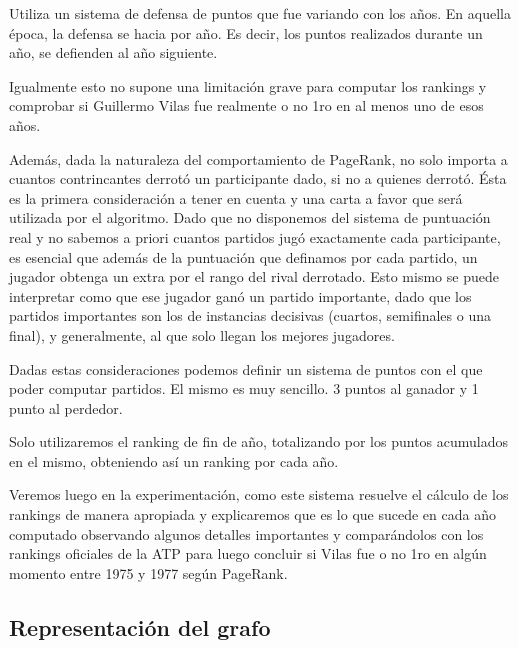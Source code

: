 Utiliza un sistema de defensa de puntos que fue variando con los años. En aquella época, la defensa se hacia por año. Es decir, los puntos realizados durante un año, se defienden al año siguiente. 

Igualmente esto no supone una limitación grave para computar los rankings y comprobar si Guillermo Vilas fue realmente o no 1ro en al menos uno de esos años.

Además, dada la naturaleza del comportamiento de PageRank, no solo importa a cuantos contrincantes derrotó un participante dado, si no a quienes derrotó. Ésta es la primera consideración a tener en cuenta y una carta a favor que será utilizada por el algoritmo. Dado que no disponemos del sistema de puntuación real y no sabemos a priori cuantos partidos jugó exactamente cada participante, es esencial que además de la puntuación que definamos por cada partido, un jugador obtenga un extra por el rango del rival derrotado. Esto mismo se puede interpretar como que ese jugador ganó un partido importante, dado que los partidos importantes son los de instancias decisivas (cuartos, semifinales o una final), y generalmente, al que solo llegan los mejores jugadores.    

Dadas estas consideraciones podemos definir un sistema de puntos con el que poder computar partidos. El mismo es muy sencillo. 3 puntos al ganador y 1 punto al perdedor.

Solo utilizaremos el ranking de fin de año, totalizando por los puntos acumulados en el mismo, obteniendo así un ranking por cada año.
 
Veremos luego en la experimentación, como este sistema resuelve el cálculo de los rankings de manera apropiada y explicaremos que es lo que sucede en cada año computado observando algunos detalles importantes y comparándolos con los rankings oficiales de la ATP para luego concluir si Vilas fue o no 1ro en algún momento entre 1975 y 1977 según PageRank.

\pagebreak


\subsection{Representación del grafo}

